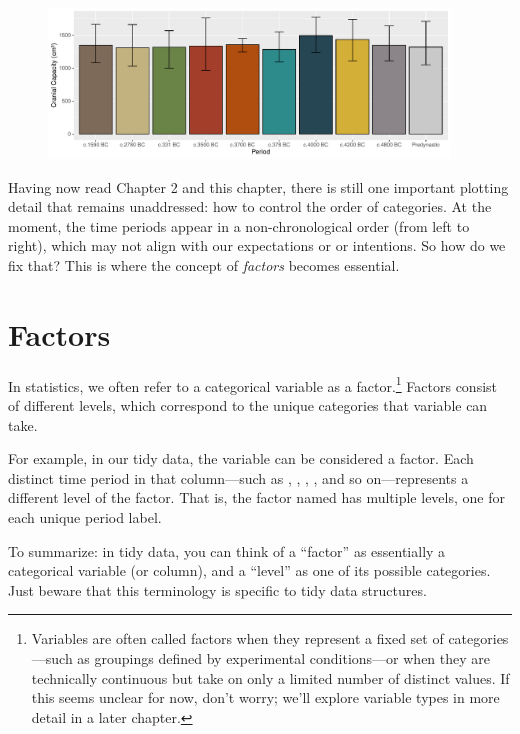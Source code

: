 \vspace{2em}

\begin{figure}[H]
\includegraphics[width = 0.95\textwidth]{graphics/ch3Figs/bar_5.pdf}
\end{figure}

Having now read Chapter 2 and this chapter, there is still one important plotting detail that remains unaddressed: how to control the order of categories. At the moment, the time periods appear in a non-chronological order (from left to right), which may not align with our expectations or or intentions. So how do we fix that? This is where the concept of \textit{factors} becomes essential.

\section{Factors}

In statistics, we often refer to a categorical variable as a \gls{factor}.\footnote{Variables are often called factors when they represent a fixed set of categories—such as groupings defined by experimental conditions—or when they are technically continuous but take on only a limited number of distinct values. If this seems unclear for now, don’t worry; we’ll explore variable types in more detail in a later chapter.} Factors consist of different \glspl{level}, which correspond to the unique categories that variable can take.

For example, in our tidy data, the variable  can be considered a factor. Each distinct time period in that column—such as , , , , and so on—represents a different level of the factor. That is, the factor named  has multiple levels, one for each unique period label.

To summarize: in tidy data, you can think of a ``factor'' as essentially a categorical variable (or column), and a ``level'' as one of its possible categories. Just beware that this terminology is specific to tidy data structures.

